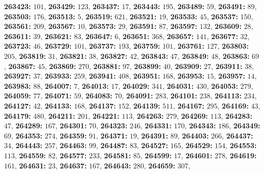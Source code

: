 \textsf{\bfseries 263423:} $101$, \textsf{\bfseries 263429:} $123$, \textsf{\bfseries 263437:} $17$, \textsf{\bfseries 263443:} $195$, \textsf{\bfseries 263489:} $59$, \textsf{\bfseries 263491:} $89$, \textsf{\bfseries 263503:} $176$, \textsf{\bfseries 263513:} $5$, \textsf{\bfseries 263519:} $621$, \textsf{\bfseries 263521:} $19$, \textsf{\bfseries 263533:} $45$, \textsf{\bfseries 263537:} $150$, \textsf{\bfseries 263561:} $209$, \textsf{\bfseries 263567:} $10$, \textsf{\bfseries 263573:} $29$, \textsf{\bfseries 263591:} $87$, \textsf{\bfseries 263597:} $132$, \textsf{\bfseries 263609:} $28$, \textsf{\bfseries 263611:} $39$, \textsf{\bfseries 263621:} $83$, \textsf{\bfseries 263647:} $6$, \textsf{\bfseries 263651:} $368$, \textsf{\bfseries 263657:} $141$, \textsf{\bfseries 263677:} $32$, \textsf{\bfseries 263723:} $46$, \textsf{\bfseries 263729:} $101$, \textsf{\bfseries 263737:} $193$, \textsf{\bfseries 263759:} $101$, \textsf{\bfseries 263761:} $127$, \textsf{\bfseries 263803:} $205$, \textsf{\bfseries 263819:} $31$, \textsf{\bfseries 263821:} $38$, \textsf{\bfseries 263827:} $42$, \textsf{\bfseries 263843:} $47$, \textsf{\bfseries 263849:} $48$, \textsf{\bfseries 263863:} $69$, \textsf{\bfseries 263867:} $45$, \textsf{\bfseries 263869:} $270$, \textsf{\bfseries 263881:} $97$, \textsf{\bfseries 263899:} $40$, \textsf{\bfseries 263909:} $27$, \textsf{\bfseries 263911:} $38$, \textsf{\bfseries 263927:} $37$, \textsf{\bfseries 263933:} $259$, \textsf{\bfseries 263941:} $408$, \textsf{\bfseries 263951:} $168$, \textsf{\bfseries 263953:} $15$, \textsf{\bfseries 263957:} $14$, \textsf{\bfseries 263983:} $88$, \textsf{\bfseries 264007:} $7$, \textsf{\bfseries 264013:} $17$, \textsf{\bfseries 264029:} $341$, \textsf{\bfseries 264031:} $430$, \textsf{\bfseries 264053:} $279$, \textsf{\bfseries 264059:} $77$, \textsf{\bfseries 264071:} $59$, \textsf{\bfseries 264083:} $70$, \textsf{\bfseries 264091:} $283$, \textsf{\bfseries 264101:} $238$, \textsf{\bfseries 264113:} $234$, \textsf{\bfseries 264127:} $42$, \textsf{\bfseries 264133:} $168$, \textsf{\bfseries 264137:} $152$, \textsf{\bfseries 264139:} $511$, \textsf{\bfseries 264167:} $295$, \textsf{\bfseries 264169:} $43$, \textsf{\bfseries 264179:} $480$, \textsf{\bfseries 264211:} $201$, \textsf{\bfseries 264221:} $113$, \textsf{\bfseries 264263:} $279$, \textsf{\bfseries 264269:} $113$, \textsf{\bfseries 264283:} $47$, \textsf{\bfseries 264289:} $167$, \textsf{\bfseries 264301:} $70$, \textsf{\bfseries 264323:} $246$, \textsf{\bfseries 264331:} $170$, \textsf{\bfseries 264343:} $186$, \textsf{\bfseries 264349:} $69$, \textsf{\bfseries 264353:} $274$, \textsf{\bfseries 264359:} $91$, \textsf{\bfseries 264371:} $19$, \textsf{\bfseries 264391:} $89$, \textsf{\bfseries 264403:} $266$, \textsf{\bfseries 264437:} $34$, \textsf{\bfseries 264443:} $257$, \textsf{\bfseries 264463:} $99$, \textsf{\bfseries 264487:} $83$, \textsf{\bfseries 264527:} $165$, \textsf{\bfseries 264529:} $154$, \textsf{\bfseries 264553:} $113$, \textsf{\bfseries 264559:} $82$, \textsf{\bfseries 264577:} $233$, \textsf{\bfseries 264581:} $85$, \textsf{\bfseries 264599:} $17$, \textsf{\bfseries 264601:} $278$, \textsf{\bfseries 264619:} $161$, \textsf{\bfseries 264631:} $23$, \textsf{\bfseries 264637:} $167$, \textsf{\bfseries 264643:} $280$, \textsf{\bfseries 264659:} $307$, 
